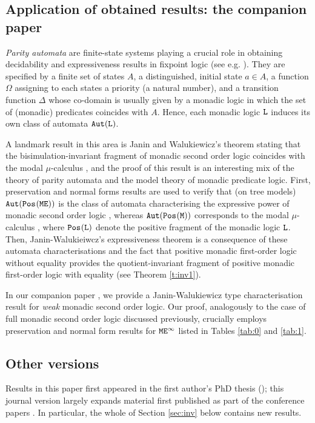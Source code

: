 \subsection*{Application of obtained results: the companion paper}
\emph{Parity automata} are finite-state systems playing a crucial role in 
obtaining decidability and expressiveness results in fixpoint logic (see e.g. 
\cite{vardi2008automata}).
They are specified by a finite set of states $A$, a distinguished, initial state
$a \in A$, a function $\Omega$ assigning to each states a priority (a natural 
number), and a transition function $\Delta$ whose co-domain is usually given by
a monadic logic in which  the set of (monadic) predicates  coincides with $A$.
Hence, each monadic logic $\mathtt{L}$ induces its own class of automata 
$\mathtt{Aut}(\mathtt{L})$.

A landmark result in this area is Janin and Walukiewicz's theorem stating that
the bisimulation-invariant fragment of monadic second order logic coincides 
with the modal $\mu$-calculus \cite{Jan96}, and the proof of this result is an 
interesting mix of the theory of parity automata and the model theory of
monadic predicate logic.
First, preservation and normal forms results are used to verify that (on tree 
models) $\mathtt{Aut}(\mathtt{Pos}_{}(\mathtt{M}\mathtt{E}))$ is the class of automata characterising the
expressive power of monadic second order logic \cite{Walukiewicz96}, whereas 
$\mathtt{Aut}(\mathtt{Pos}_{}(\mathtt{M}))$ corresponds to the modal $\mu$-calculus \cite{JaninW95},
where $\mathtt{Pos}_{}(\mathtt{L})$ denote the positive fragment of the monadic logic 
$\mathtt{L}$. 
Then, Janin-Walukieiwcz's expressiveness theorem is a consequence of these 
automata characterisations and the fact that positive monadic first-order 
logic without equality provides the quotient-invariant fragment of positive
monadic first-order logic with equality (see Theorem \ref{t:inv1}).

In our companion paper \cite{companionWEAK}, we provide a Janin-Walukiewicz 
type characterisation result for \emph{weak} monadic second order logic.
Our proof, analogously to the case of full monadic second order logic discussed 
previously,  crucially employs preservation and normal form results for $\mathtt{M}\mathtt{E}^{\infty}$
listed in  Tables \ref{tab:0} and \ref{tab:1}. 



\subsection*{Other versions}
Results in this paper first appeared in the first author's PhD thesis
(\cite[Chapter 5]{carreiro2015fragments}); this journal version largely expands
material first published as part of the conference 
papers \cite{DBLP:conf/lics/FacchiniVZ13,carreiro2014weak}. 
In particular, the whole of Section \ref{sec:inv} below contains new results.

